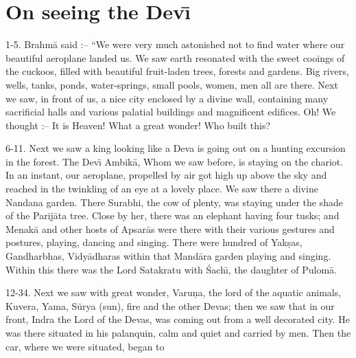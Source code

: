 \chapter{On seeing the Dev\={\i}}

1-5. Brahm\=a said :-- ``We were very much astonished not to find water where our beautiful aeroplane landed us. We saw earth resonated with the sweet cooings of the cuckoos, filled with beautiful fruit-laden trees, forests and gardens. Big rivers, wells, tanks, ponds, water-springs, small pools, women, men all are there. Next we saw, in front of us, a nice city enclosed by a divine wall, containing many sacrificial halls and various palatial buildings and magnificent edifices. Oh! We thought :-- It is Heaven! What a great wonder! Who built this?

6-11. Next we saw a king looking like a Deva is going out on a hunting excursion in the forest. The Dev\={\i} Ambik\=a, Whom we saw before, is staying on the chariot. In an instant, our aeroplane, propelled by air got high up above the sky and reached in the twinkling of an eye at a lovely place. We saw there a divine Nandana garden. There Surabhi, the cow of plenty, was staying under the shade of the Parij\=ata tree. Close by her, there was an elephant having four tusks; and Menak\=a and other hosts of Apsar\=as were there with their various gestures and postures, playing, dancing and singing. There were hundred of Yak\d{s}as, Gandharbhas, Vidy\=adharas within that Mand\=ara garden playing and singing. Within this there was the Lord Satakratu with \'Sach\={\i}, the daughter of Pulom\=a.

12-34. Next we saw with great wonder, Varu\d{n}a, the lord of the aquatic animals, Kuvera, Yama, S\=urya (sun), fire and the other Devas; then we saw that in our front, Indra the Lord of the Devas, was coming out from a well decorated city. He was there situated in his palanquin, calm and quiet and carried by men. Then the car, where we were situated, began to

